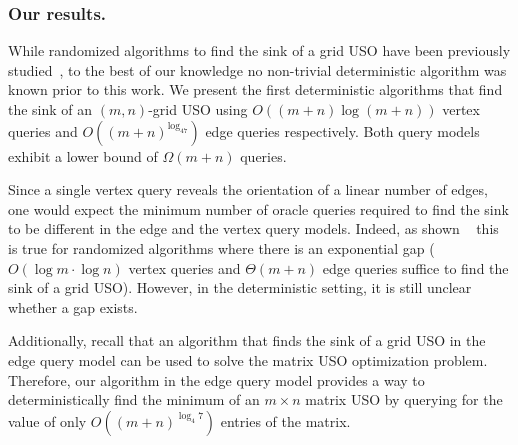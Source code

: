 \documentclass[runningheads,a4paper]{llncs}
\begin{document}



\subsubsection{Our results.}

While randomized algorithms to find the sink of a grid USO have been previously studied~\cite{grid05,linepoint,grid08,falkthesis}, 
to the best of our knowledge no non-trivial deterministic algorithm was known prior to this work. 
We present the first deterministic algorithms that find the sink of an $(m,n)$-grid USO using $O((m+n)\log (m+n))$ vertex queries
and 
$O((m+n)^{\log_47})$ edge queries respectively.
Both query models exhibit a lower bound of $\Omega(m+n)$ queries.

Since a single vertex query reveals the orientation of a linear number of edges, one would expect the minimum number of  oracle queries required to find the sink to be different in the edge and the vertex query models.
Indeed, as shown ~\citet{grid08} this is true for randomized algorithms where there is an exponential gap ($O(\log m\cdot \log n)$ vertex queries and $\Theta(m+n)$ edge queries suffice to find the sink of a grid USO).
However, in the deterministic setting, it is still unclear whether a gap exists.

Additionally, recall that an algorithm that finds the sink of a grid USO in the edge query model can be used to solve the matrix USO optimization problem. 
Therefore, our algorithm in the edge query model provides a way to deterministically find the minimum of an $m\times n$ matrix USO by querying for the value of only $O((m+n)^{\log_4 7})$ entries of the matrix. 
\end{document}
